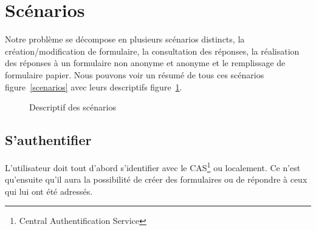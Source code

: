 \documentclass{sigplanconf}
\begin{document}
\section{Scénarios}\label{sec:scenarios}
Notre problème se décompose en plusieurs scénarios distincts, la création/modification de formulaire, la consultation des réponses, la réalisation des réponses à un formulaire non anonyme et anonyme et le remplissage de formulaire papier. Nous pouvons voir un résumé de tous ces scénarios figure~\ref{scenarios} avec leurs descriptifs figure~\ref{listScenarios}.
\begin{figure}
\begin{center}
\end{center}
\caption{Descriptif des scénarios}
\label{listScenarios}
\end{figure}

\subsection{S'authentifier}
L’utilisateur doit tout d’abord s'identifier avec le CAS\footnote{Central Authentification Service} ou localement. Ce n'est qu'ensuite qu'il aura la possibilité de créer des formulaires ou de répondre à ceux qui lui ont été adressés.
\end{document}
